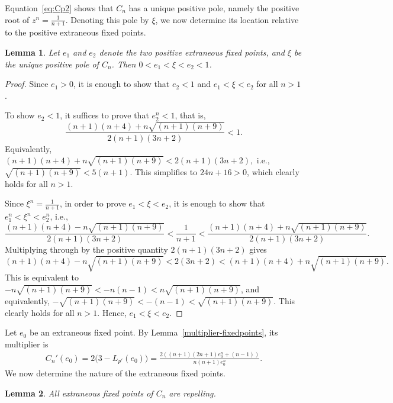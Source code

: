\documentclass[12pt]{article}
\newtheorem{lem}{Lemma}[section]
\begin{document}
%
Equation~\eqref{eq:Cp2} shows that $C_n$ has a unique positive pole, namely the positive root of $z^n =\frac{1}{n+1}$. Denoting this pole by $\xi$, we now determine its location relative to the positive extraneous fixed points. 
\begin{lem}
Let  $e_1$ and $e_2$ denote the two positive extraneous fixed points, and $\xi$ be the unique positive pole of $C_n$. Then $0<e_1<\xi<e_2<1$.
		\label{extraneous}
	\end{lem}
\begin{proof}
Since $e_1>0$, it is enough to show that $e_2<1$ and $e_1< \xi <e_2$ for all $n> 1$.
		
To show $e_2<1$, it suffices to prove that $e_2^n<1$, that is, 
$$\frac{(n+1)(n+4)+ n \sqrt{(n+1)(n+9)}}{2(n+1)(3n+2)}<1.$$
Equivalently, $(n+1)(n+4)+ n \sqrt{(n+1)(n+9)}<2(n+1)(3n+2),$ i.e., 
$\sqrt{(n+1)(n+9)}<5(n+1).$ This simplifies to $24n+16>0$, which clearly holds for all $n>1$. 
		
		Since $\xi^n=\frac{1}{n+1}$, in order to prove $e_1<\xi<e_2$, it is enough to show that $e_1^n < \xi ^n< e_2^n$, i.e., 
		$$\frac{(n+1)(n+4)- n \sqrt{(n+1)(n+9)}}{2(n+1)(3n+2)}<\frac{1}{n+1}<\frac{(n+1)(n+4)+ n \sqrt{(n+1)(n+9)}}{2(n+1)(3n+2)}.$$
		Multiplying through by the positive quantity $2(n+1)(3n+2)$ gives 
		$$(n+1)(n+4)- n \sqrt{(n+1)(n+9)}<2(3n+2)<(n+1)(n+4)+ n \sqrt{(n+1)(n+9)}.$$ 
     This is equivalent to 
	 $ -n \sqrt{(n+1)(n+9)}<-n(n-1)< n \sqrt{(n+1)(n+9)} $, and equivalently, 
	 $ - \sqrt{(n+1)(n+9)}<-(n-1)< \sqrt{(n+1)(n+9)}.$  
	This clearly holds for all $n>1$. Hence, $e_1<\xi<e_2$.
	\end{proof}
Let $e_0$ be an extraneous fixed point. By Lemma~\ref{multiplier-fixedpoints}, its multiplier is 
	\begin{align}
		C_n'(e_0) =2\big(3-L_{p'}(e_0)\big) 
		 =\frac{2\left( (n+1)(2n+1)e_0^n+(n-1)\right)}{n(n+1)e_0^n}.
		 \label{ext_mult}
	\end{align}	
	We now determine the nature of the extraneous fixed points.
	\begin{lem}
		All extraneous fixed points of $C_n$ are repelling.
	\end{lem}
	
\end{document}
